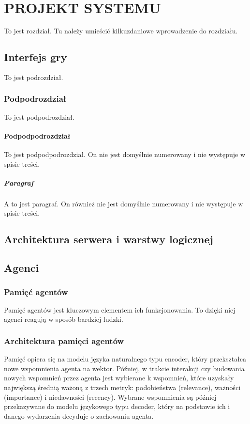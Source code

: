 \chapter{PROJEKT SYSTEMU}

To jest rozdział. Tu należy umieścić kilkuzdaniowe wprowadzenie do rozdziału.




\section{Interfejs gry}

To jest podrozdział.

\subsection{Podpodrozdział}

To jest podpodrozdział.

\subsubsection{Podpodpodrozdział}

To jest podpodpodrozdział. On nie jest domyślnie numerowany i nie występuje w spisie treści.

\paragraph{Paragraf}

A to jest paragraf. On również nie jest domyślnie numerowany i nie występuje w spisie treści.




\section{Architektura serwera i warstwy logicznej}

\section{Agenci}

\subsection{Pamięć agentów}
Pamięć agentów jest kluczowym elementem ich funkcjonowania.
To dzięki niej agenci reagują w sposób bardziej ludzki.

\subsection*{Architektura pamięci agentów}
Pamięć opiera się na modelu języka naturalnego typu encoder, który przekształca
nowe wspomnienia agenta na wektor. Później, w trakcie interakcji czy budowania nowych
wspomnień przez agenta jest wybierane k wspomnień, które uzyskały największą średnią
ważoną z trzech metryk: podobieństwa (relevance), ważności (importance) i niedawności (recency).
Wybrane wspomnienia są później przekazywane do modelu językowego typu decoder, który na
podstawie ich i danego wydarzenia decyduje o zachowaniu agenta.

